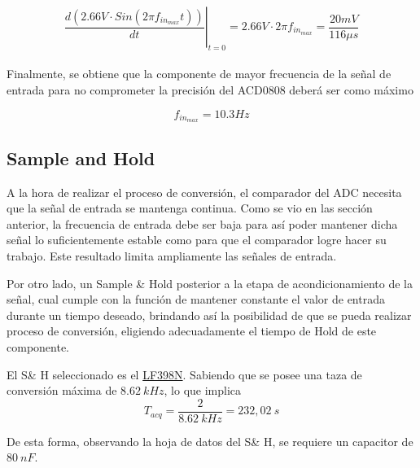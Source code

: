 \begin{equation}
\left. \frac{d \left( 2.66V \cdot Sin \left( 2\pi f_{in_{max}} t \right) \right)}{dt} \right|_{t=0} = 2.66V \cdot 2\pi f_{in_{max}} = \frac{20mV}{116\mu s}
\end{equation}
\\


Finalmente, se obtiene que la componente de mayor frecuencia de la señal de entrada para no comprometer la precisión del ACD0808 deberá ser como máximo

$$f_{in_{max}} = 10.3Hz$$

\subsection{Sample and Hold}
A la hora de realizar el proceso de conversión, el comparador del ADC necesita que la señal de entrada se mantenga continua. Como se vio en las sección anterior, la frecuencia de entrada debe ser baja para así poder mantener dicha señal lo suficientemente estable como para que el comparador logre hacer su trabajo. Este resultado limita ampliamente las señales de entrada.
 
Por otro lado, un Sample \& Hold posterior a la etapa de acondicionamiento de la señal, cual cumple con la función de mantener constante el valor de entrada durante un tiempo deseado, brindando así la posibilidad de que se pueda realizar proceso de conversión, eligiendo adecuadamente el tiempo de Hold de este componente.

El S\& H seleccionado es el \href{https://pdf1.alldatasheet.es/datasheet-pdf/view/8580/NSC/LF398N.html}{LF398N}. Sabiendo que se posee una taza de conversión máxima de $8.62 \ kHz$, lo que implica
\begin{equation*}
	T_{acq} = \frac{2}{8.62 \ kHz} = 232,02 \ s
\end{equation*}

De esta forma, observando la hoja de datos del S\& H, se requiere un capacitor de $80 \ nF$.

